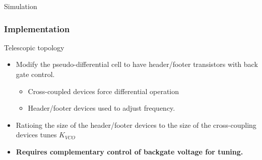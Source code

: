 \documentclass[t, screen, aspectratio=43]{beamer}
\begin{document}
\begin{frame}
\begin{block}{Simulation}
\begin{minipage}{6cm}
\begin{figure}[htb!]
			\end{figure}

		\end{minipage}%

	\end{block}	

\end{frame}


\begin{frame}
	\frametitle{Implementation}
	\begin{block}{Telescopic topology}
		\begin{minipage}{6cm}
			\vspace{1em}
			\tiny

			\begin{itemize}[itemsep=4pt,label=\protect---]
				\item Modify the pseudo-differential cell to have header/footer transistors with back gate control.
				\begin{itemize}[itemsep=4pt,label=$\bullet$]
					\item Cross-coupled devices force differential operation
					\item Header/footer devices used to adjust frequency.
				\end{itemize}				
				\item Ratioing the size of the header/footer devices to the size of the cross-coupling devices tunes $K_{VCO}$
				\item \textbf{Requires complementary control of backgate voltage for tuning.}
			\end{itemize}
		\end{minipage}%
		\begin{minipage}{6cm}
			\begin{figure}[htb!]
			        \centering

\end{figure}
\end{minipage}
\end{block}
\end{frame}
\end{document}
